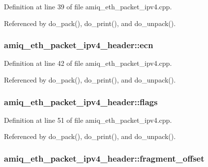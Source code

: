 Definition at line 39 of file amiq\_\-eth\_\-packet\_\-ipv4.cpp.

Referenced by do\_\-pack(), do\_\-print(), and do\_\-unpack().\hypertarget{classamiq__eth__packet__ipv4__header_aaf142f739eebdae4966502146fb9a75b}{
\subsubsection[{ecn}]{ {\bf amiq\_\-eth\_\-packet\_\-ipv4\_\-header::ecn}}}
\label{classamiq__eth__packet__ipv4__header_aaf142f739eebdae4966502146fb9a75b}


Definition at line 42 of file amiq\_\-eth\_\-packet\_\-ipv4.cpp.

Referenced by do\_\-pack(), do\_\-print(), and do\_\-unpack().\hypertarget{classamiq__eth__packet__ipv4__header_aea7ee65cc360e6ba9a900ddd459af4cd}{
\subsubsection[{flags}]{ {\bf amiq\_\-eth\_\-packet\_\-ipv4\_\-header::flags}}}
\label{classamiq__eth__packet__ipv4__header_aea7ee65cc360e6ba9a900ddd459af4cd}


Definition at line 51 of file amiq\_\-eth\_\-packet\_\-ipv4.cpp.

Referenced by do\_\-pack(), do\_\-print(), and do\_\-unpack().\hypertarget{classamiq__eth__packet__ipv4__header_ab74e113c5af1421e19bcd0d3cee96ddf}{
\subsubsection[{fragment\_\-offset}]{ {\bf amiq\_\-eth\_\-packet\_\-ipv4\_\-header::fragment\_\-offset}}}
\label{classamiq__eth__packet__ipv4__header_ab74e113c5af1421e19bcd0d3cee96ddf}


